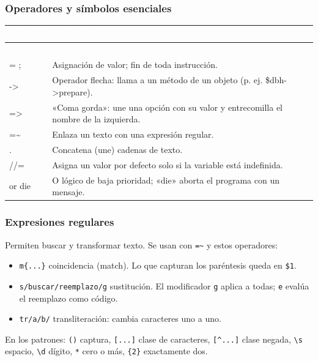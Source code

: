 \documentclass[11pt]{article}
\begin{document}
\subsubsection{Operadores y símbolos esenciales}
{\renewcommand{\arraystretch}{1.25}
\begin{longtable}{>{\raggedright\arraybackslash}p{2.4cm} >{\raggedright\arraybackslash}p{13cm}}
\rowcolor{uteqverde}\textcolor{white}{\textbf{Símbolo}} & \textcolor{white}{\textbf{Significado}} \\
\endfirsthead
\rowcolor{uteqverde}\textcolor{white}{\textbf{Símbolo}} & \textcolor{white}{\textbf{Significado}} \\
\endhead
\ttfamily\color{uteqverde}= ; & Asignación de valor; fin de toda instrucción. \\ \hline
\ttfamily\color{uteqverde}-\textgreater{} & Operador flecha: llama a un método de un objeto (p. ej. \$dbh-\textgreater{}prepare). \\ \hline
\ttfamily\color{uteqverde}=\textgreater{} & «Coma gorda»: une una opción con su valor y entrecomilla el nombre de la izquierda. \\ \hline
\ttfamily\color{uteqverde}=\textasciitilde{} & Enlaza un texto con una expresión regular. \\ \hline
\ttfamily\color{uteqverde}. & Concatena (une) cadenas de texto. \\ \hline
\ttfamily\color{uteqverde}//= & Asigna un valor por defecto solo si la variable está indefinida. \\ \hline
\ttfamily\color{uteqverde}or die & O lógico de baja prioridad; «die» aborta el programa con un mensaje. \\ \hline
\end{longtable}}
\subsubsection{Expresiones regulares}
Permiten buscar y transformar texto. Se usan con \texttt{=\textasciitilde{}} y estos operadores:

\begin{itemize}[leftmargin=1.4em,itemsep=2pt,topsep=2pt]
\item \texttt{m\{...\}}  coincidencia (match). Lo que capturan los paréntesis queda en \texttt{\$1}.
\item \texttt{s/buscar/reemplazo/g}  sustitución. El modificador \texttt{g} aplica a todas; \texttt{e} evalúa el reemplazo como código.
\item \texttt{tr/a/b/}  transliteración: cambia caracteres uno a uno.
\end{itemize}
En los patrones: \texttt{()} captura, \texttt{[...]} clase de caracteres, \texttt{[\textasciicircum{}...]} clase negada, \texttt{\textbackslash{}s} espacio, \texttt{\textbackslash{}d} dígito, \texttt{*} cero o más, \texttt{\{2\}} exactamente dos.
\end{document}
